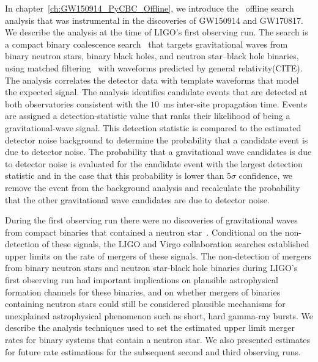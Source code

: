 In chapter~\ref{ch:GW150914_PyCBC_Offline}, we introduce the \pycbc{}\ offline search analysis that was instrumental in the discoveries of GW150914 and GW170817. We describe the analysis at the time of LIGO's first observing run. The \pycbc{} search is a compact binary coalescence search~\cite{thorne.k:1987,Sathyaprakash:1991mt,Cutler:1992tc,Finn:1992wt,Finn:1992xs,Dhurandhar:1992mw,Balasubramanian:1995bm,Flanagan:1997sx} that targets gravitational waves from binary neutron stars, binary black holes, and neutron star--black hole binaries, using matched filtering~\cite{wainstein:1962} with waveforms predicted by general relativity(CITE).  The \pycbc{} analysis correlates the detector data with template waveforms that model the expected signal. The analysis identifies candidate events that are detected at both observatories consistent with the $10$~ms inter-site propagation time. Events are assigned a detection-statistic value that ranks their likelihood of being a gravitational-wave signal. This detection statistic is compared to the estimated detector noise background to determine the probability that a candidate event is due to detector noise. The probability that a gravitational wave candidates is due to detector noise is evaluated for the candidate event with the largest detection statistic and in the case that this probability is lower than $5 \sigma$ confidence, we remove the event from the background analysis and recalculate the probability that the other gravitational wave candidates are due to detector noise.

During the first observing run there were no discoveries of gravitational waves from compact binaries that contained a neutron star~\cite{O1BBH}. Conditional on the non-detection of these signals, the LIGO and Virgo collaboration searches established upper limits on the rate of mergers of these signals. The non-detection of mergers from binary neutron stars and neutron star-black hole binaries during LIGO's first observing run had important implications on plausible astrophysical formation channels for these binaries, and on whether mergers of binaries containing neutron stars could still be considered plausible mechanisms for unexplained astrophysical phenomenon such as short, hard gamma-ray bursts. We describe the analysis techniques used to set the estimated upper limit merger rates for binary systems that contain a neutron star. We also presented estimates for future rate estimations for the subsequent second and third observing runs.

